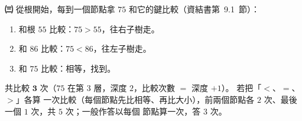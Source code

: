 \begin{pastsoln}
\textbf{㈢} 從根開始，每到一個節點拿 $75$ 和它的鍵比較（資結書第~9.1~節）：
\begin{enumerate}[label=(\arabic*)]
\item 和根 $55$ 比較：$75 > 55$，往右子樹走。
\item 和 $86$ 比較：$75 < 86$，往左子樹走。
\item 和 $75$ 比較：相等，找到。
\end{enumerate}
共比較 $\mathbf{3}$ 次（$75$ 在第 $3$ 層，深度 $2$，比較次數 $=$ 深度 $+ 1$）。 若把「$<$、$=$、$>$」各算
一次比較（每個節點先比相等、再比大小），前兩個節點各 $2$ 次、最後一個 $1$ 次，共 $5$ 次；一般作答以每個
節點算一次，答 $3$ 次。
\end{pastsoln}
